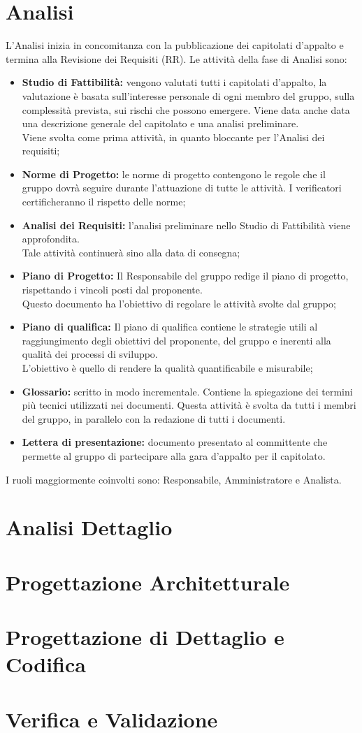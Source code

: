 \section{Analisi}
L'Analisi inizia in concomitanza con la pubblicazione dei capitolati d’appalto e termina alla Revisione dei Requisiti (RR).
Le attività della fase di Analisi sono:
\begin{itemize}
    \item \textbf{Studio di Fattibilità:} vengono valutati tutti i capitolati d'appalto, la valutazione è basata sull'interesse personale di ogni membro del gruppo, sulla complessità prevista, sui rischi che possono emergere. Viene data anche data una descrizione generale del capitolato e una analisi preliminare.\\Viene svolta come prima attività, in quanto bloccante per l'Analisi dei requisiti;
    \item \textbf{Norme di Progetto:} le norme di progetto contengono le regole che il gruppo dovrà seguire durante l'attuazione di tutte le attività. I verificatori certificheranno il rispetto delle norme;
    \item \textbf{Analisi dei Requisiti:} l'analisi preliminare nello Studio di Fattibilità viene approfondita.\\Tale attività continuerà sino alla data di consegna;
    \item \textbf{Piano di Progetto:} Il Responsabile del gruppo redige il piano di progetto, rispettando i vincoli posti dal proponente.\\Questo documento ha l'obiettivo di regolare le attività svolte dal gruppo;
    \item \textbf{Piano di qualifica:} Il piano di qualifica contiene le strategie utili al raggiungimento degli obiettivi del proponente, del gruppo e inerenti alla qualità dei processi di sviluppo.\\L'obiettivo è quello di rendere la qualità quantificabile e misurabile;
    \item \textbf{Glossario:} scritto in modo incrementale. Contiene la spiegazione dei termini più tecnici utilizzati nei documenti. Questa attività è svolta da tutti i membri del gruppo, in parallelo con la redazione di tutti i documenti.
    \item \textbf{Lettera di presentazione:} documento presentato al committente che permette al gruppo di partecipare alla gara d’appalto per il capitolato.
\end{itemize}
I ruoli maggiormente coinvolti sono: Responsabile, Amministratore e Analista.
\section{Analisi Dettaglio}
\section{Progettazione Architetturale}
\section{Progettazione di Dettaglio e Codifica}
\section{Verifica e Validazione}
